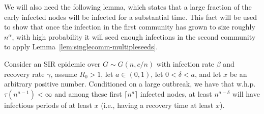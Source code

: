 \documentclass[11pt]{article}
\begin{document}
We will also need the following lemma, which states that a large fraction of the early infected nodes will be infected for a substantial time. This fact will be used to show that
once the infection in the first community has grown to size roughly $n^\alpha$, with high probability it will seed enough infections in the second community to apply Lemma~\ref{lem:singlecomm-multipleseeds}.

\begin{lemma}\label{lem:emprical-distribution-Gnp}
Consider an SIR epidemic over $G\sim G(n,c/n)$ with infection rate $\beta$ and recovery rate $\gamma$, assume $R_0>1$,  let $a\in (0,1)$, let $0<\delta<a$, and let $x$ be an arbitrary positive number. Conditioned on a large outbreak, we have that w.h.p. $\tau(n^{a-1}) < \infty$ and among these first $\lceil n^a \rceil$ infected nodes, at least $n^{a - \delta}$ will have infectious periods of at least $x$ (i.e., having a recovery time at least $x$). 
\end{lemma}
\end{document}
